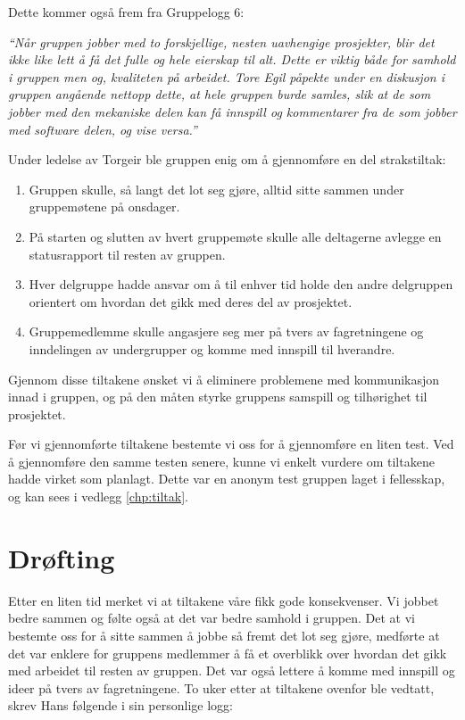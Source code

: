 Dette kommer også frem fra Gruppelogg 6:\newline

\emph{``Når gruppen jobber med to forskjellige, nesten uavhengige prosjekter, blir det ikke like lett å få det fulle og hele eierskap til alt. Dette er viktig både for samhold i gruppen men og, kvaliteten på arbeidet. Tore Egil påpekte under en diskusjon i gruppen angående nettopp dette, at hele gruppen burde samles, slik at de som jobber med den mekaniske delen kan få innspill og kommentarer fra de som jobber med software delen, og vise versa.''}\newline

Under ledelse av Torgeir ble gruppen enig om å gjennomføre en del strakstiltak:

\begin{enumerate}
\item Gruppen skulle, så langt det lot seg gjøre, alltid sitte sammen under gruppemøtene på onsdager. 
\item På starten og slutten av hvert gruppemøte skulle alle deltagerne avlegge en statusrapport til resten av gruppen. 
\item Hver delgruppe hadde ansvar om å til enhver tid holde den andre delgruppen orientert om hvordan det gikk med deres del av prosjektet.
\item Gruppemedlemme skulle angasjere seg mer på tvers av fagretningene og inndelingen av undergrupper og komme med innspill til hverandre. 
\end{enumerate}

Gjennom disse tiltakene ønsket vi å eliminere problemene med kommunikasjon innad i gruppen, og på den måten styrke gruppens samspill og tilhørighet til prosjektet.\newline

Før vi gjennomførte tiltakene bestemte vi oss for å gjennomføre en liten test. Ved å gjennomføre den samme testen senere, kunne vi enkelt vurdere om tiltakene hadde virket som planlagt. Dette var en anonym test gruppen laget i fellesskap, og kan sees i vedlegg \ref{chp:tiltak}.

\section{Drøfting}
Etter en liten tid merket vi at tiltakene våre fikk gode konsekvenser. Vi jobbet bedre sammen og følte også at det var bedre samhold i gruppen. 
Det at vi bestemte oss for å sitte sammen å jobbe så fremt det lot seg gjøre, medførte at det var enklere for gruppens medlemmer å få et overblikk over hvordan det gikk med arbeidet til resten av gruppen. Det var også lettere å komme med innspill og ideer på tvers av fagretningene. 
To uker etter at tiltakene ovenfor ble vedtatt, skrev Hans følgende i sin personlige logg:\newline

